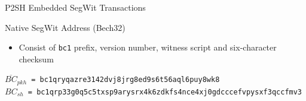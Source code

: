 \documentclass[handout]{beamer}
\begin{document}
\begin{frame}{P2SH Embedded SegWit Transactions}

	\begin{figure}
			
	\end{figure}
	\vspace{1.5em}
	
	\vspace{1em}
	
	\end{frame}

\begin{frame}{Native SegWit Address (Bech32)}
	\begin{itemize}
		\item Consist of \texttt{bc1} prefix, version number, witness script and six-character checksum	
	\end{itemize}
	
	\vspace{1.5em}
	
	\begin{scriptsize}
		\texttt{$\overline{BC}_{pkh}$ = bc1qryqazre3142dvj8jrg8ed9s6t56aql6puy8wk8}\\
		\texttt{$BC_{sh}$ = bc1qrp33g0q5c5txsp9arysrx4k6zdkfs4nce4xj0gdcccefvpysxf3qccfmv3}
	\end{scriptsize}
\end{frame}
\end{document}
